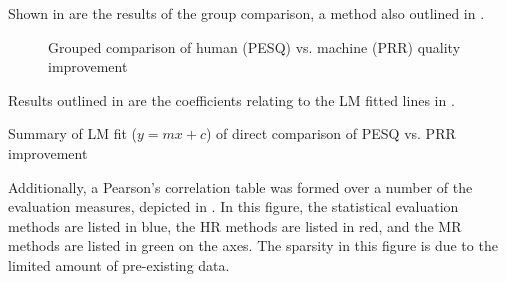 Shown in  are the results of the group comparison,
a method also outlined in .

\begin{figure}[p]

\protect\caption{\label{fig:Group-PESQ-PRR}Grouped comparison of human (\acs{PESQ})
vs. machine (\acs{PRR}) quality improvement}
\end{figure}


Results outlined in  are the
coefficients relating to the \ac{LM} fitted lines in .

\begin{table}[h]
\protect\caption{\label{tab:LF-Fit-Direct-Compar-PESQ-PRR}Summary of \acs{LM} fit
($y=mx+c$) of direct comparison of \acs{PESQ} vs. \acs{PRR} improvement}


\centering{}
\end{table}


Additionally, a Pearson's correlation table was formed over a number
of the evaluation measures, depicted in . In this
figure, the statistical evaluation methods are listed in blue, the
\ac{HR} methods are listed in red, and the \ac{MR} methods are listed
in green on the axes. The sparsity in this figure is due to the limited
amount of pre-existing data.

